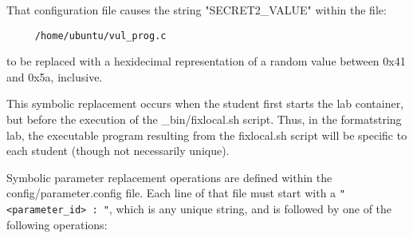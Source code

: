 \documentclass[12pt]{article}
\begin{document}
That configuration file causes the string "SECRET2\_VALUE" within the file:
\begin{verbatim}
     /home/ubuntu/vul_prog.c
\end{verbatim}
to be replaced with a hexidecimal representation of a random value
between 0x41 and 0x5a, inclusive.

This symbolic replacement occurs when the student first starts the lab container,
but before the execution of the \_bin/fixlocal.sh script.  Thus, in the formatstring
lab, the executable program resulting from the fixlocal.sh script will be specific
to each student (though not necessarily unique).

Symbolic parameter replacement operations are defined within the config/parameter.config file.
Each line of that file must start with a \verb!"<parameter_id> : "!, which is any unique string, and
is followed by one of the following operations:
\end{document}
